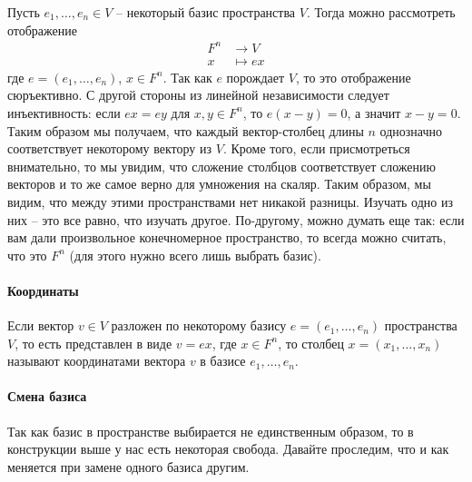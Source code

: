 Пусть $e_1,\ldots,e_n\in V$ -- некоторый базис пространства $V$.
Тогда можно рассмотреть отображение 
\begin{align*}
F^n &\to V\\
x &\mapsto ex
\end{align*}
где $e=(e_1,\ldots,e_n)$, $x\in F^n$.
Так как $e$ порождает $V$, то это отображение сюръективно.
С другой стороны из линейной независимости следует инъективность: если $ex = ey$ для $x,y\in F^n$, то $e (x - y) = 0$, а значит $ x - y = 0$.
Таким образом мы получаем, что каждый вектор-столбец длины $n$ однозначно соответствует некоторому вектору из $V$.
Кроме того, если присмотреться внимательно, то мы увидим, что сложение столбцов соответствует сложению векторов и то же самое верно для умножения на скаляр.
Таким образом, мы видим, что между этими пространствами нет никакой разницы.
Изучать одно из них -- это все равно, что изучать другое.
По-другому, можно думать еще так: если вам дали произвольное конечномерное пространство, то всегда можно считать, что это $F^n$ (для этого нужно всего лишь выбрать базис).

\paragraph{Координаты}

Если вектор $v\in V$ разложен по некоторому базису $e = (e_1,\ldots,e_n)$ пространства $V$, то есть представлен в виде $v = ex$, где $x\in F^n$, то столбец $x = (x_1,\ldots,x_n)$ называют координатами вектора $v$ в базисе $e_1,\ldots, e_n$.

\paragraph{Смена базиса}

Так как базис в пространстве выбирается не единственным образом, то в конструкции выше у нас есть некоторая свобода.
Давайте проследим, что и как меняется при замене одного базиса другим.

